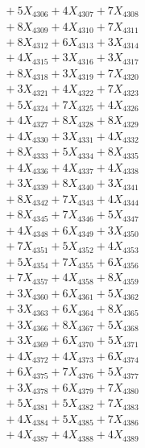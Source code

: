 \documentclass[a4paper,10pt]{article}
\begin{document}
{\begin{align}
&\;  + 5 X_{4306} + 4 X_{4307} + 7 X_{4308} \\[0.3ex]
&\;  + 8 X_{4309} + 4 X_{4310} + 7 X_{4311} \\[0.3ex]
&\;  + 8 X_{4312} + 6 X_{4313} + 3 X_{4314} \\[0.3ex]
&\;  + 4 X_{4315} + 3 X_{4316} + 3 X_{4317} \\[0.3ex]
&\;  + 8 X_{4318} + 3 X_{4319} + 7 X_{4320} \\[0.3ex]
&\;  + 3 X_{4321} + 4 X_{4322} + 7 X_{4323} \\[0.3ex]
&\;  + 5 X_{4324} + 7 X_{4325} + 4 X_{4326} \\[0.3ex]
&\;  + 4 X_{4327} + 8 X_{4328} + 8 X_{4329} \\[0.5ex]\allowbreak
&\;  + 4 X_{4330} + 3 X_{4331} + 4 X_{4332} \\[0.3ex]
&\;  + 8 X_{4333} + 5 X_{4334} + 8 X_{4335} \\[0.3ex]
&\;  + 4 X_{4336} + 4 X_{4337} + 4 X_{4338} \\[0.3ex]
&\;  + 3 X_{4339} + 8 X_{4340} + 3 X_{4341} \\[0.3ex]
&\;  + 8 X_{4342} + 7 X_{4343} + 4 X_{4344} \\[0.3ex]
&\;  + 8 X_{4345} + 7 X_{4346} + 5 X_{4347} \\[0.3ex]
&\;  + 4 X_{4348} + 6 X_{4349} + 3 X_{4350} \\[0.3ex]
&\;  + 7 X_{4351} + 5 X_{4352} + 4 X_{4353} \\[0.3ex]
&\;  + 5 X_{4354} + 7 X_{4355} + 6 X_{4356} \\[0.3ex]
&\;  + 7 X_{4357} + 4 X_{4358} + 8 X_{4359} \\[0.5ex]\allowbreak
&\;  + 3 X_{4360} + 6 X_{4361} + 5 X_{4362} \\[0.3ex]
&\;  + 3 X_{4363} + 6 X_{4364} + 8 X_{4365} \\[0.3ex]
&\;  + 3 X_{4366} + 8 X_{4367} + 5 X_{4368} \\[0.3ex]
&\;  + 3 X_{4369} + 6 X_{4370} + 5 X_{4371} \\[0.3ex]
&\;  + 4 X_{4372} + 4 X_{4373} + 6 X_{4374} \\[0.3ex]
&\;  + 6 X_{4375} + 7 X_{4376} + 5 X_{4377} \\[0.3ex]
&\;  + 3 X_{4378} + 6 X_{4379} + 7 X_{4380} \\[0.3ex]
&\;  + 5 X_{4381} + 5 X_{4382} + 7 X_{4383} \\[0.3ex]
&\;  + 4 X_{4384} + 5 X_{4385} + 7 X_{4386} \\[0.3ex]
&\;  + 4 X_{4387} + 4 X_{4388} + 4 X_{4389} \\[0.5ex]\allowbreak

\end{align}}
\end{document}
